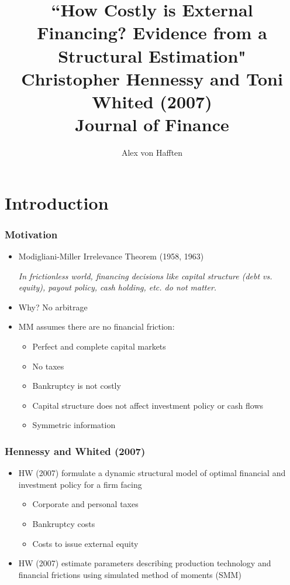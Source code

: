 \documentclass[usenames,dvipsnames, handout]{beamer}
\title[HW (2007)]{``How Costly is External Financing? Evidence from a Structural Estimation"\\Christopher Hennessy and Toni Whited (2007)\\Journal of Finance}
\author{Alex von Hafften}
\institute{UW-Madison}
\begin{document}
\begin{frame}
\titlepage
\end{frame}

\section{Introduction}

\begin{frame}
\frametitle{Motivation}
\small
\begin{itemize}
\item Modigliani-Miller Irrelevance Theorem (1958, 1963) 

\bigskip

\textit{In frictionless world, financing decisions like capital structure (debt vs. equity), payout policy, cash holding, etc. do not matter.}
\bigskip
\item Why? No arbitrage
\bigskip
\item MM assumes there are no financial friction:
\begin{itemize}
\item Perfect and complete capital markets
\item No taxes
\item Bankruptcy is not costly
\item Capital structure does not affect investment policy or cash flows
\item Symmetric information
\end{itemize}
\end{itemize}
\end{frame}



\begin{frame}
\frametitle{Hennessy and Whited (2007)}
\small
\begin{itemize}
\item HW (2007) formulate a dynamic structural model of optimal financial and investment policy for a firm facing
\begin{itemize}
\item Corporate and personal taxes
\item Bankruptcy costs
\item Costs to issue external equity
\end{itemize}
\bigskip
\item HW (2007) estimate parameters describing production technology and financial frictions using simulated method of moments (SMM)
\end{itemize}
\end{frame}
\end{document}
